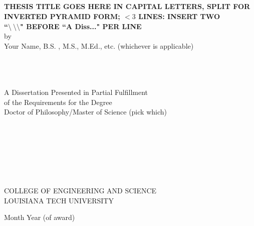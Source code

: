 \begin{center}\begin{singlespace}%
\ \\ %
\ \\ %
\ \\ %
\ \\ %
\end{singlespace}
{ \normalsize \textbf{
THESIS TITLE GOES HERE IN CAPITAL LETTERS, SPLIT FOR \\  %
INVERTED PYRAMID FORM; $<3$ LINES: INSERT TWO \\      %
``$\setminus \ \setminus \setminus$" BEFORE ``A Diss..." PER LINE
}} \\
by\\
Your Name, B.S. , M.S., M.Ed., etc. (whichever is applicable)
\vfill
\begin{singlespace}%
\ \\
\ \\
\ \\
A Dissertation Presented in Partial Fulfillment \\
of the Requirements for the Degree \\
Doctor of Philosophy/Master of Science (pick which) \\
\ \\
\ \\
\ \\
\ \\
\ \\
\ \\
\ \\
COLLEGE OF ENGINEERING AND SCIENCE\\
LOUISIANA TECH UNIVERSITY\\
\vfill

Month Year (of award)
\end{singlespace}
\end{center}



